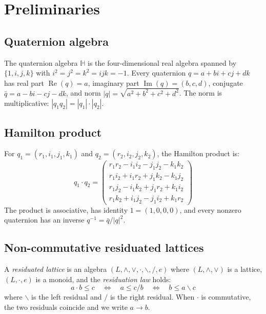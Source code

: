 \documentclass[11pt,a4paper]{article}
\newcommand{\Real}{\operatorname{Re}}
\newcommand{\Imag}{\operatorname{Im}}
\newcommand{\Hq}{\mathbb{H}}
\begin{document}
\section{Preliminaries}
\label{sec:prelim}

\subsection{Quaternion algebra}

The quaternion algebra $\Hq$ is the four-dimensional real algebra
spanned by $\{1, i, j, k\}$ with $i^2 = j^2 = k^2 = ijk = -1$.
Every quaternion $q = a + bi + cj + dk$ has real part $\Real(q) = a$,
imaginary part $\Imag(q) = (b, c, d)$, conjugate
$\bar{q} = a - bi - cj - dk$, and norm
$|q| = \sqrt{a^2 + b^2 + c^2 + d^2}$. The norm is multiplicative:
$|q_1 q_2| = |q_1| \cdot |q_2|$.

\subsection{Hamilton product}

For $q_1 = (r_1, i_1, j_1, k_1)$ and $q_2 = (r_2, i_2, j_2, k_2)$,
the Hamilton product is:
\begin{equation}
\label{eq:hamilton}
q_1 \cdot q_2 = \begin{pmatrix}
  r_1 r_2 - i_1 i_2 - j_1 j_2 - k_1 k_2 \\
  r_1 i_2 + i_1 r_2 + j_1 k_2 - k_1 j_2 \\
  r_1 j_2 - i_1 k_2 + j_1 r_2 + k_1 i_2 \\
  r_1 k_2 + i_1 j_2 - j_1 i_2 + k_1 r_2
\end{pmatrix}
\end{equation}
The product is associative, has identity $1 = (1, 0, 0, 0)$, and every
nonzero quaternion has an inverse $q^{-1} = \bar{q}/|q|^2$.

\subsection{Non-commutative residuated lattices}

A \emph{residuated lattice} \citep{galatos2007} is an algebra
$(L, \wedge, \vee, \cdot, \backslash, /, e)$ where $(L, \wedge, \vee)$
is a lattice, $(L, \cdot, e)$ is a monoid, and the \emph{residuation
law} holds:
\begin{equation}
\label{eq:residuation}
a \cdot b \leq c
  \quad\Longleftrightarrow\quad
  a \leq c / b
  \quad\Longleftrightarrow\quad
  b \leq a \backslash c
\end{equation}
where $\backslash$ is the left residual and $/$ is the right residual.
When $\cdot$ is commutative, the two residuals coincide and we write
$a \to b$.
\end{document}
